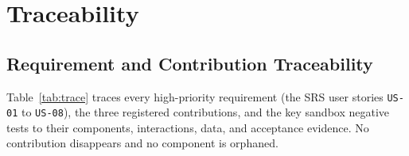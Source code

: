 \documentclass[12pt,a4paper]{article}
\begin{document}
\section{Traceability}
\label{sec:traceability}

\subsection{Requirement and Contribution Traceability}

Table~\ref{tab:trace} traces every high-priority requirement (the SRS user stories \texttt{US-01} to \texttt{US-08}), the three registered contributions, and the key sandbox negative tests to their components, interactions, data, and acceptance evidence. No contribution disappears and no component is orphaned.
\end{document}
